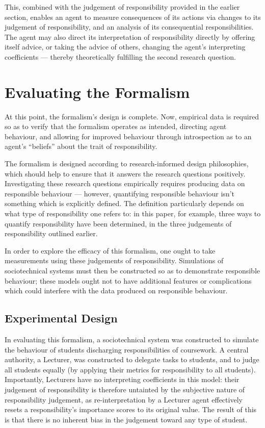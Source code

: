 This, combined with the judgement of responsibility provided in the earlier section, enables an agent to measure consequences of its actions via changes to its judgement of responsibility, and an analysis of its consequential responsibilities. The agent may also direct its interpretation of responsibility directly by offering itself advice, or taking the advice of others, changing the agent's interpreting coefficients --- thereby theoretically fulfilling the second research question.\par


\section{Evaluating the Formalism}\label{sec:evaluation}
At this point, the formalism's design is complete. Now, empirical data is required so as to verify that the formalism operates as intended, directing agent behaviour, and allowing for improved behaviour through introspection as to an agent's ``beliefs'' about the trait of responsibility.\par

The formalism is designed according to research-informed design philosophies, which should help to ensure that it answers the research questions positively. Investigating these research questions empirically requires producing data on responsible behaviour --- however, quantifying responsible behaviour isn't something which is explicitly defined. The definition particularly depends on what type of responsibility one refers to: in this paper, for example, three ways to quantify responsibility have been determined, in the three judgements of responsibility outlined earlier.\par

In order to explore the efficacy of this formalism, one ought to take measurements using these judgements of responsibility. Simulations of sociotechnical systems must then be constructed so as to demonstrate responsible behaviour; these models ought not to have additional features or complications which could interfere with the data produced on responsible behaviour.\par

\subsection{Experimental Design}
In evaluating this formalism, a sociotechnical system was constructed to simulate the behaviour of students discharging responsibilities of coursework. A central authority, a Lecturer, was constructed to delegate tasks to students, and to judge all students equally (by applying their metrics for responsibility to all students). Importantly, Lecturers have no interpreting coefficients in this model: their judgement of responsibility is therefore untainted by the subjective nature of responsibility judgement, as re-interpretation by a Lecturer agent effectively resets a responsibility's importance scores to its original value. The result of this is that there is no inherent bias in the judgement toward any type of student.\par

